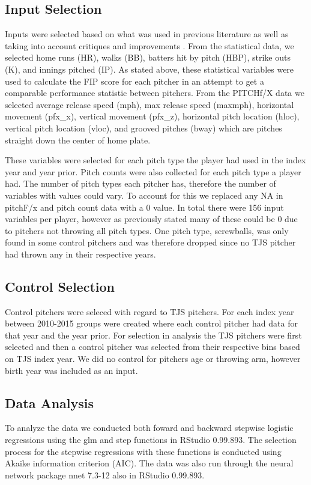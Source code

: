 \subsection{Input Selection}

Inputs were selected based on what was used in previous literature as well as taking into account critiques and improvements \cite{Gray2014}. From the statistical data, we selected home runs (HR), walks (BB), batters hit by pitch (HBP), strike outs (K), and innings pitched (IP). As stated above, these statistical variables were used to calculate the FIP score for each pitcher in an attempt to get a comparable performance statistic between pitchers. From the PITCHf/X data we selected average release speed (mph), max release speed (maxmph), horizontal movement (pfx\_x), vertical movement (pfx\_z), horizontal pitch location (hloc), vertical pitch location (vloc), and grooved pitches (bway) which are pitches straight down the center of home plate.

These variables were selected for each pitch type the player had used in the index year and year prior. Pitch counts were also collected for each pitch type a player had. The number of pitch types each pitcher has, therefore the number of variables with values could vary. To account for this we replaced any NA in pitchF/x and pitch count data with a 0 value. In total there were 156 input variables per player, however as previously stated many of these could be 0 due to pitchers not throwing all pitch types. One pitch type, screwballs, was only found in some control pitchers and was therefore dropped since no TJS pitcher had thrown any in their respective years.

\subsection{Control Selection}

Control pitchers were seleced with regard to TJS pitchers. For each index year between 2010-2015 groups were created where each control pitcher had data for that year and the year prior. For selection in analysis the TJS pitchers were first selected and then a control pitcher was selected from their respective bins based on TJS index year. We did no control for pitchers age or throwing arm, however birth year was included as an input.

\subsection{Data Analysis}
To analyze the data we conducted both foward and backward stepwise logistic regressions using the glm and step functions in RStudio 0.99.893. The selection process for the stepwise regressions with these functions is conducted using Akaike information criterion (AIC). The data was also run through the neural network package nnet 7.3-12 also in RStudio 0.99.893.




